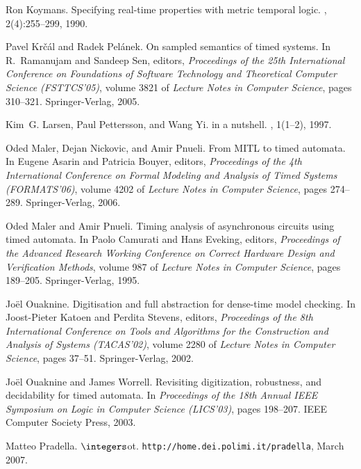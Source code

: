 \documentclass[a4paper]{article}
\newcommand{\zot}{$\integers$ot}
\theoremstyle{plain}
\theoremstyle{definition}
\begin{document}
\begin{thebibliography}{10}
Ron Koymans.
\newblock Specifying real-time properties with metric temporal logic.
, 2(4):255--299, 1990.

Pavel Kr{\v c}{\' a}l and Radek Pel{\' a}nek.
\newblock On sampled semantics of timed systems.
\newblock In R.~Ramanujam and Sandeep Sen, editors, {\em Proceedings of the
  25th International Conference on Foundations of Software Technology and
  Theoretical Computer Science (FSTTCS'05)}, volume 3821 of {\em Lecture Notes
  in Computer Science}, pages 310--321. Springer-Verlag, 2005.

Kim~G. Larsen, Paul Pettersson, and Wang Yi.
 in a nutshell.
, 1(1--2), 1997.

Oded Maler, Dejan Nickovic, and Amir Pnueli.
\newblock From {MITL} to timed automata.
\newblock In Eugene Asarin and Patricia Bouyer, editors, {\em Proceedings of
  the 4th International Conference on Formal Modeling and Analysis of Timed
  Systems (FORMATS'06)}, volume 4202 of {\em Lecture Notes in Computer
  Science}, pages 274--289. Springer-Verlag, 2006.

Oded Maler and Amir Pnueli.
\newblock Timing analysis of asynchronous circuits using timed automata.
\newblock In Paolo Camurati and Hans Eveking, editors, {\em Proceedings of the
  Advanced Research Working Conference on Correct Hardware Design and
  Verification Methods}, volume 987 of {\em Lecture Notes in Computer Science},
  pages 189--205. Springer-Verlag, 1995.

Jo{\" e}l Ouaknine.
\newblock Digitisation and full abstraction for dense-time model checking.
\newblock In Joost-Pieter Katoen and Perdita Stevens, editors, {\em Proceedings
  of the 8th International Conference on Tools and Algorithms for the
  Construction and Analysis of Systems (TACAS'02)}, volume 2280 of {\em Lecture
  Notes in Computer Science}, pages 37--51. Springer-Verlag, 2002.

Jo{\" e}l Ouaknine and James Worrell.
\newblock Revisiting digitization, robustness, and decidability for timed
  automata.
\newblock In {\em Proceedings of the 18th Annual IEEE Symposium on Logic in
  Computer Science (LICS'03)}, pages 198--207. IEEE Computer Society Press,
  2003.

Matteo Pradella.
\newblock \zot{}.
\newblock \texttt{http://home.dei.polimi.it/pradella}, March 2007.


\end{thebibliography}
\end{document}
